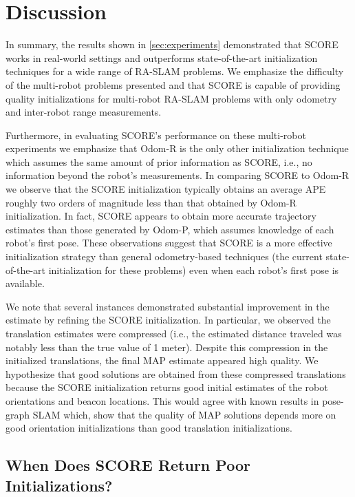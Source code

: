 \section{Discussion}

In summary, the results shown in
\cref{sec:experiments} demonstrated
that SCORE works in real-world settings and outperforms state-of-the-art
initialization techniques for a wide range of RA-SLAM problems. We emphasize
the difficulty of the multi-robot problems presented and that SCORE is capable
of providing quality initializations for multi-robot RA-SLAM problems with only
odometry and inter-robot range measurements.

\MultiRobotAPEBoxPlot

Furthermore, in evaluating SCORE's performance on these multi-robot experiments
we emphasize that Odom-R is the only other initialization technique which
assumes the same amount of prior information as SCORE, i.e., no information
beyond the robot's measurements. In comparing SCORE to Odom-R we observe that
the SCORE initialization typically obtains an average APE roughly two orders of
magnitude less than that obtained by Odom-R initialization. In fact, SCORE
appears to obtain more accurate trajectory estimates than those generated by
Odom-P, which assumes knowledge of each robot's first pose. These
observations suggest that SCORE is a more effective initialization strategy than
general odometry-based techniques (the current state-of-the-art initialization
for these problems) even when each robot's first pose is
available.

We note that several instances demonstrated substantial improvement in the
estimate by refining the SCORE initialization. In particular, we observed the
translation estimates were compressed (i.e., the estimated distance traveled was
notably less than the true value of 1 meter). Despite this compression in the
initialized translations, the final MAP estimate appeared high quality. We
hypothesize that good solutions are obtained from these compressed translations
because the SCORE initialization returns good initial estimates of the robot
orientations and beacon locations. This would agree with known results in
pose-graph SLAM \cite{carlone15icra} which, show that the quality of MAP
solutions depends more on good orientation initializations than good
translation initializations.


\subsection{When Does SCORE Return Poor Initializations?}
\label{sec:limitations}

